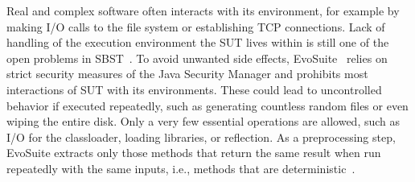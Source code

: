 \documentclass{article}
\begin{document}

Real and complex software often interacts with its environment, for example by making I/O calls to the file system or establishing TCP connections. Lack of handling of the execution environment the \ac{SUT} lives within is still one of the open problems in \ac{SBST}~\cite{McMinn2011}. To avoid unwanted side effects, EvoSuite~\cite{Fraser2013a} relies on strict security measures of the Java Security Manager and prohibits most interactions of \ac{SUT} with its environments. These could lead to uncontrolled behavior if executed repeatedly, such as generating countless random files or even wiping the entire disk. Only a very few essential operations are allowed, such as I/O for the classloader, loading libraries, or reflection. As a preprocessing step, EvoSuite extracts only those methods that return the same result when run repeatedly with the same inputs, i.e., methods that are deterministic~\cite{Fraser2012}.

\end{document}
